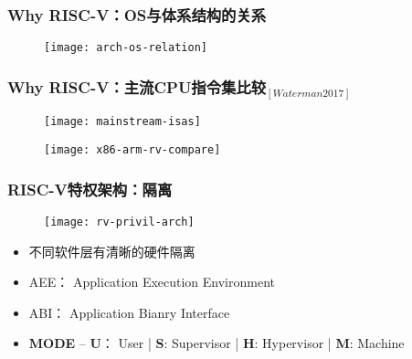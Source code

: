 
\begin{frame}
	
	\frametitle{Why RISC-V：\small{OS与体系结构的关系}}
	
	\begin{figure}
		\centering
		\texttt{[image: arch-os-relation]}
	\end{figure}
	
\end{frame}


\begin{frame}
	
	\frametitle{Why RISC-V：\small{主流CPU指令集比较$ _{[Waterman 2017]} $}}
	
	\begin{figure}
		\centering
		\texttt{[image: mainstream-isas]}
	\end{figure}
	\pause
	
	\begin{figure}
		\centering
		\texttt{[image: x86-arm-rv-compare]}
	\end{figure}
	
	
	
	
\end{frame}


\begin{frame}
	\frametitle{RISC-V特权架构：\small{隔离}}
	
	\begin{figure}
	\centering
	\texttt{[image: rv-privil-arch]}
	\end{figure}

\begin{itemize}
	
	\item 不同软件层有清晰的硬件隔离
	\item AEE： Application Execution Environment
	\item ABI： Application Bianry Interface
	\item \textbf{MODE} -- \textbf{U}： User | \textbf{S}: Supervisor | \textbf{H}: Hypervisor | \textbf{M}: Machine

\end{itemize}

\end{frame}

